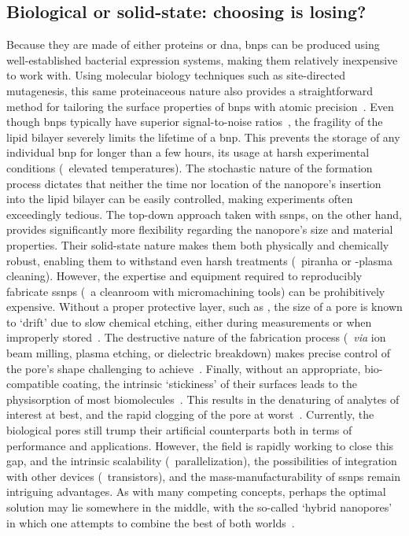 \subsection{Biological or solid-state: choosing is losing?}
%

Because they are made of either proteins or \gls{dna}, \glspl{bnp} can be produced using well-established
bacterial expression systems, making them relatively inexpensive to work with. Using molecular biology
techniques such as site-directed mutagenesis, this same proteinaceous nature also provides a straightforward
method for tailoring the surface properties of \glspl{bnp} with atomic
precision~\cite{Howorka-2001,RinconRestrepo-2011}. Even though \glspl{bnp} typically have superior
signal-to-noise ratios~\cite{Fragasso-2020}, the fragility of the lipid bilayer severely limits the lifetime
of a \gls{bnp}. This prevents the storage of any individual \gls{bnp} for longer than a few hours, its usage
at harsh experimental conditions (\eg~elevated temperatures). The stochastic nature of the formation process
dictates that neither the time nor location of the nanopore's insertion into the lipid bilayer can be easily
controlled, making experiments often exceedingly tedious. The top-down approach taken with \glspl{ssnp}, on
the other hand, provides significantly more flexibility regarding the nanopore's size and material properties.
Their solid-state nature makes them both physically and chemically robust, enabling them to withstand even
harsh treatments (\eg~piranha or -plasma cleaning). However, the expertise and equipment required to
reproducibly fabricate \glspl{ssnp} (\ie~a cleanroom with micromachining tools) can be prohibitively
expensive. Without a proper protective layer, such as , the size of a  pore is known to
`drift' due to slow chemical etching, either during measurements or when improperly stored~\cite{Chou-2020}. The
destructive nature of the fabrication process (\eg~\textit{via} ion beam milling, plasma etching, or
dielectric breakdown) makes precise control of the pore's shape challenging to achieve~\cite{vandenHout-2010}.
Finally, without an appropriate, bio-compatible coating, the intrinsic `stickiness' of their surfaces leads to
the physisorption of most biomolecules~\cite{Eggenberger-2019,Awasthi-2020}. This results in the denaturing
of analytes of interest at best, and the rapid clogging of the pore at worst~\cite{Yusko-2011}. Currently, the
biological pores still trump their artificial counterparts both in terms of performance and applications.
However, the field is rapidly working to close this gap, and the intrinsic scalability (\eg~parallelization),
the possibilities of integration with other devices (\eg~transistors), and the mass-manufacturability of
\glspl{ssnp} remain intriguing advantages. As with many competing concepts, perhaps the optimal solution may
lie somewhere in the middle, with the so-called `hybrid nanopores' in which one attempts to combine the best
of both worlds~\cite{Hall-2010,Im-2010,Cai-2018}.

